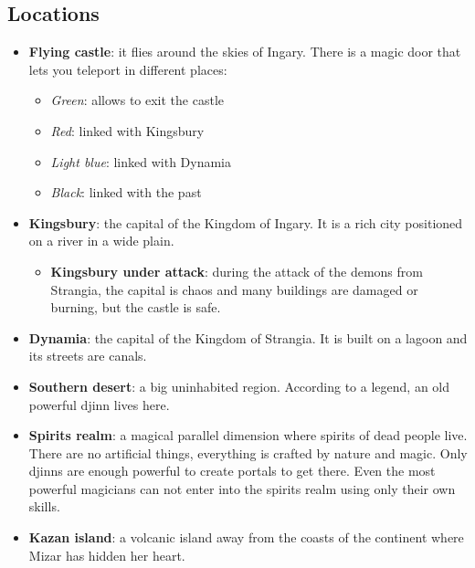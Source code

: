\subsection{Locations}
\begin{itemize}
	\item \textbf{Flying castle}: it flies around the skies of Ingary. There is a magic door that lets you teleport in different places:
	\begin{itemize}
		\item \textit{Green}: allows to exit the castle
		\item \textit{Red}: linked with Kingsbury
		\item \textit{Light blue}: linked with Dynamia
		\item \textit{Black}: linked with the past
	\end{itemize}
	
	\item \textbf{Kingsbury}: the capital of the Kingdom of Ingary. It is a rich city positioned on a river in a wide plain.
	
\begin{itemize}
	\item \textbf{Kingsbury under attack}: during the attack of the demons from Strangia, the capital is chaos and many buildings are damaged or burning, but the castle is safe.
\end{itemize}
	
	\item \textbf{Dynamia}: the capital of the Kingdom of Strangia. It is built on a lagoon and its streets are canals.
	
	\item \textbf{Southern desert}: a big uninhabited region. According to a legend, an old powerful djinn lives here.
	
	\item \textbf{Spirits realm}: a magical parallel dimension where spirits of dead people live. There are no artificial things, everything is crafted by nature and magic. Only djinns are enough powerful to create portals to get there. Even the most powerful magicians can not enter into the spirits realm using only their own skills.

	\item \textbf{Kazan island}: a volcanic island away from the coasts of the continent where Mizar has hidden her heart.
	
\end{itemize}
